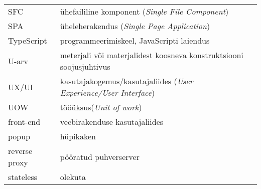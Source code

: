 \begin{longtable}{p{3cm}p{10cm}}
SFC&ühefaililine komponent (\emph{Single File Component})\\
SPA&üheleherakendus (\emph{Single Page Application})\\
TypeScript&programmeerimiskeel, JavaScripti laiendus\\
U-arv&meterjali või materjalidest koosneva konstruktsiooni soojusjuhtivus\\
UX/UI&kasutajakogemus/kasutajaliides (\emph{User Experience/User Interface})\\
UOW&tööüksus(\emph{Unit of work})\\
front-end&veebirakenduse kasutajaliides\\
popup&hüpikaken\\
reverse proxy&pööratud puhverserver\\
stateless&olekuta\\
\end{longtable}
\addtocounter{table}{-1} 